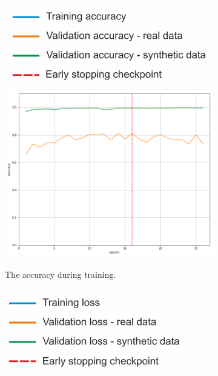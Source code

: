 \begin{figure}[!h]
\centering
    \begin{subfigure}[t]{.45\textwidth}
        \centering
        \includegraphics[width=.7\textwidth]{images/popisAc.png}
        \includegraphics[width=\textwidth]{images/accuracy51ss2_0.png}
        \caption{The accuracy during training.}
        \label{fig:accm22}
    \end{subfigure}
    \begin{subfigure}[t]{.45\textwidth}
        \centering
        \includegraphics[width=.7\textwidth]{images/popisLoss.png}

\end{subfigure}
\end{figure}
